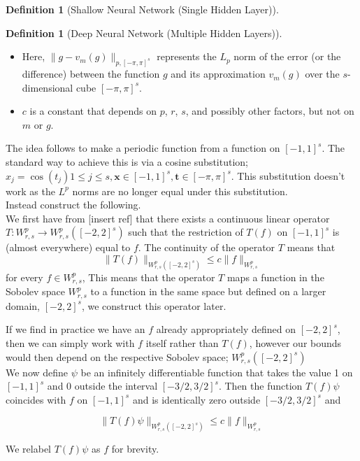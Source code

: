 \documentclass[11pt,a4paper]{article}
\theoremstyle{plain}
\theoremstyle{definition}
\newtheorem{definition}[theorem]{Definition}
\theoremstyle{remark}
\begin{document}
\begin{definition}[Shallow Neural Network (Single Hidden Layer)]
\begin{definition}[Deep Neural Network (Multiple Hidden Layers)]
\begin{itemize}
    \item  Here, \( \|g - v_m(g)\|_{p, [-\pi,\pi]^s} \) represents the \( L_p \) norm of the error (or the difference) between the function \( g \) and its approximation \( v_m(g) \) over the \( s \)-dimensional cube \( [-\pi, \pi]^s \).
    \item \( c \) is a constant that depends on \( p \), \( r \), \( s \), and possibly other factors, but not on \( m \) or \( g \).
\end{itemize}

The idea follows to make a periodic function from a function on \([-1,1]^s\). The standard way to achieve this is via a cosine substitution; \(x_{j} = \cos (t_{j}) 1 \leq j \leq s, \mathbf{x} \in [-1,1]^s, \mathbf{t} \in [-\pi ,\pi ]^s\). This substitution doesn't work as the \(L^p\) norms are no longer equal under this substitution.\\

Instead construct the following.\\
We first have from [insert ref] that there exists a continuous linear operator \( T: W_{r,s}^{p} \to W_{r,s}^{p}([-2,2]^s) \) such that the restriction of \( T(f) \) on \( [-1,1]^s \) is (almost everywhere) equal to \( f \). The continuity of the operator \( T \) means that
\[
    \|T(f)\|_{W_{r,s}^{p}([-2,2]^s)} \leq c \|f\|_{W_{r,s}^{p}}  
\]
for every \(f \in W_{r,s}^{p}\), This means that the operator \( T \) maps a function in the Sobolev space \( W_{r,s}^{p} \) to a function in the same space but defined on a larger domain, \( [-2, 2]^s \), we construct this operator later.

If we find in practice we have an \(f\) already appropriately defined on \([-2,2]^s\), then we can simply work with \(f\) itself rather than \(T(f)\), however our bounds would then depend on the respective Sobolev space; \(W_{r,s}^{p}([-2,2]^s)\) \\

We now define \(\psi \) be an infinitely differentiable function that takes the value 1 on \([-1,1]^s\) and \(0\)  outside the interval \([-3/2,3/2]^s\). Then the function \(T(f)\psi \) coincides with \(f\) on \([-1,1]^s\) and is identically zero outside \([-3/2,3/2]^s\) and

\setcounter{equation}{3} 
\begin{equation}
    \|T(f)\psi\|_{W_{r,s}^{p}([-2,2]^s)} \leq c \|f\|_{W_{r,s}^{p}}  
\end{equation}

We relabel \(T(f)\psi\) as \(f\) for brevity.


\end{definition}
\end{definition}
\end{document}
